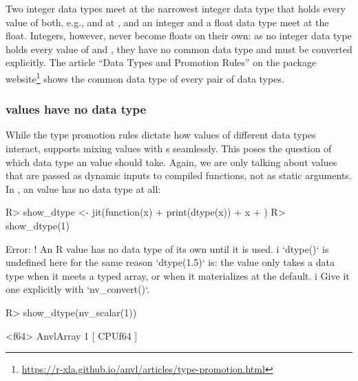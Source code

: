 \documentclass[article,shortnames]{jss}
\renewenvironment{CodeChunk}{\par\addvspace{0.6\baselineskip}\noindent\begin{minipage}{\linewidth}}{\end{minipage}\par\vspace{0.6\baselineskip}}
\begin{document}
Two integer data types meet at the narrowest integer data type that holds every value of both, e.g.,  and  at , and an integer and a float data type meet at the float.
Integers, however, never become floats on their own: as no integer data type holds every value of  and , they have no common data type and must be converted explicitly.
The article ``Data Types and Promotion Rules'' on the package website\footnote{\url{https://r-xla.github.io/anvl/articles/type-promotion.html}} shows the common data type of every pair of data types.

\subsubsection[R values have no data type]{ values have no data type}\label{r-values}

While the type promotion rules dictate how values of different data types interact,  supports mixing  values with s seamlessly.
This poses the question of which data type an  value should take.
Again, we are only talking about  values that are passed as dynamic inputs to compiled functions, not as static arguments.
In , an  value has no data type at all:

\begin{CodeChunk}
\begin{CodeInput}
R> show_dtype <- jit(function(x) {
+    print(dtype(x))
+    x
+  })
R> show_dtype(1)
\end{CodeInput}
\begin{CodeOutput}
Error:
! An R value has no data type of its own until it is used.
i `dtype()` is undefined here for the same reason `dtype(1.5)` is: the value
  only takes a data type when it meets a typed array, or when it materializes
  at the default.
i Give it one explicitly with `nv_convert()`.
\end{CodeOutput}
\begin{CodeInput}
R> show_dtype(nv_scalar(1))
\end{CodeInput}
\begin{CodeOutput}
<f64>
AnvlArray
 1
[ CPUf64{} ]
\end{CodeOutput}
\end{CodeChunk}
\end{document}

